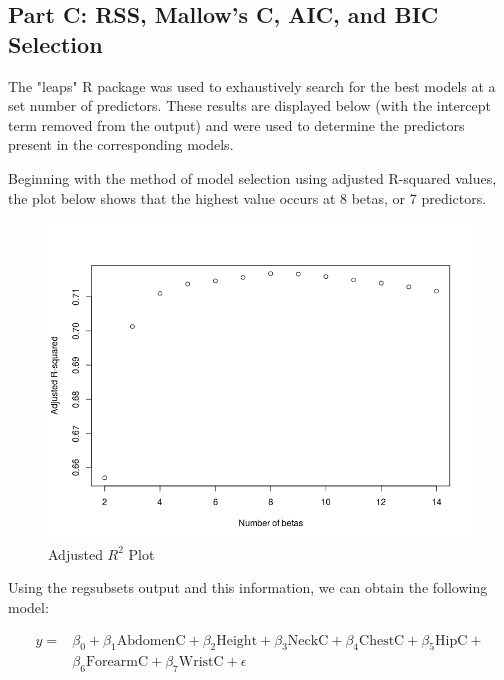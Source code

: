 \documentclass[a4paper, 11pt]{article}
\begin{document}
\subsection*{Part C: RSS, Mallow's C, AIC, and BIC Selection}
The "leaps" R package was used to exhaustively search for the best models at a set number of predictors. These results are displayed below (with the intercept term removed from the output) and were used to determine the predictors present in the corresponding models.
\begin{changemargin}{-2cm}{-2cm}
	\begin{center}
		
	\end{center}
\end{changemargin}

Beginning with the method of model selection using adjusted R-squared values, the plot below shows that the highest value occurs at 8 betas, or 7 predictors.
\begin{figure}[H]
	\centering
	\caption{Adjusted $R^2$ Plot}
	\centerline{\includegraphics[width=.8\textwidth]{adj_r2.png}}
\end{figure}

Using the regsubsets output and this information, we can obtain the following model:

\begin{align*}
	y = & \beta_0 + \beta_1\text{AbdomenC} + \beta_2\text{Height} + \beta_3\text{NeckC} + \beta_4\text{ChestC} + \beta_5\text{HipC} + \\
	&\beta_6\text{ForearmC} + \beta_7\text{WristC} + \epsilon
\end{align*}
\end{document}
